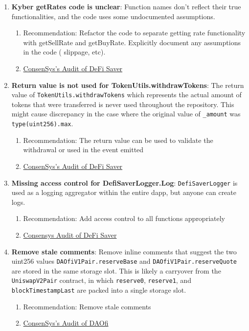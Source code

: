 \begin{enumerate}
\item\textbf{Kyber getRates code is unclear}: Function names don’t reflect their true functionalities, and the code uses some undocumented assumptions.
	\begin{enumerate}
	\item Recommendation: Refactor the code to separate getting rate functionality with getSellRate and getBuyRate. Explicitly document any assumptions in the code ( slippage, etc).
	\item\href{https://consensys.net/diligence/audits/2021/03/defi-saver/\#kyber-getrates-code-is-unclear}{ConsenSys's Audit of DeFi Saver}
	\end{enumerate}

\item\textbf{Return value is not used for TokenUtils.withdrawTokens}: The return value of \verb|TokenUtils.withdrawTokens| which represents the actual amount of tokens that were transferred is never used throughout the repository. This might cause discrepancy in the case where the original value of \verb|_amount| was \verb|type(uint256).max|.
	\begin{enumerate}
	\item Recommendation: The return value can be used to validate the withdrawal or used in the event emitted
	\item\href{https://consensys.net/diligence/audits/2021/03/defi-saver/\#return-value-is-not-used-for-tokenutils-withdrawtokens}{ConsenSys's Audit of DeFi Saver}
	\end{enumerate}

\item\textbf{Missing access control for DefiSaverLogger.Log}: \verb|DefiSaverLogger| is used as a logging aggregator within the entire dapp, but anyone can create logs.
	\begin{enumerate}
	\item Recommendation: Add access control to all functions appropriately
	\item\href{about:blank}{Consensys Audit of DeFi Saver}
	\end{enumerate}

\item\textbf{Remove stale comments}: Remove inline comments that suggest the two uint256 values \verb|DAOfiV1Pair.reserveBase| and \verb|DAOfiV1Pair.reserveQuote| are stored in the same storage slot. This is likely a carryover from the \verb|UniswapV2Pair| contract, in which \verb|reserve0|, \verb|reserve1|, and \verb|blockTimestampLast| are packed into a single storage slot.
	\begin{enumerate}
	\item Recommendation: Remove stale comments
	\item\href{https://consensys.net/diligence/audits/2021/02/daofi/\#remove-stale-comments}{ConsenSys's Audit of DAOfi}
	\end{enumerate}


\end{enumerate}
